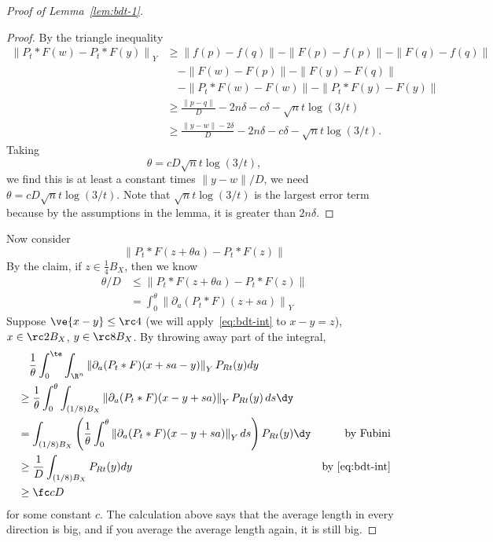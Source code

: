\begin{proof}[Proof of Lemma~\ref{lem:bdt-1}]
\begin{proof}
By the triangle inequality 
\begin{align*}
\left\|P_t * F(w) - P_t*F(y)\right\|_Y 
&\geq \|f(p) - f(q)\| - \|F(p) - f(p)\| - \|F(q) - f(q)\| \\
&\quad - \|F(w) - F(p)\| - \|F(y) - F(q)\| \\
&\quad- \|P_t*F(w) - F(w)\| - \|P_t*F(y) - F(y)\|\\
&\ge \frac{\|p - q\|}{D} - 2n\delta - c\delta - \sqrt{n}t\log(3/t)\\ &\geq \frac{\|y - w\| - 2\delta}{D} - 2n\delta - c\delta - \sqrt{n}t\log(3/t) .
\end{align*}
Taking $$\theta = cD\sqrt{n}t\log(3/t),$$ we find this is at least a constant times $\|y - w\|/D$, we need $\theta = cD\sqrt{n}t\log(3/t)$. Note that $\sqrt{n}t\log(3/t)$ is the largest error term because by the assumptions in the lemma, it is greater than $2n\delta$. 
\end{proof}
Now consider
\[
\left\|P_t * F(z + \theta a) - P_t * F(z)\right\|
\]
By the claim, if $z \in \frac{1}{4}B_X$, then we know 
\begin{align}
\theta/D &\leq \left\|P_t * F(z + \theta a) - P_t* F(z)\right\|\\
&= \int_{0}^{\theta} \left\|\partial_a(P_t*F)(z + sa)\right\|_Y 
\label{eq:bdt-int}
\end{align}
Suppose $\ve{x-y}\le \rc4$ (we will apply~\eqref{eq:bdt-int} to $x-y=z$), $x\in \rc2 B_X$, $y\in \rc8 B_X$. By throwing away part of the integral,
\begin{align}
&\quad \frac{1}{\theta}\int_0^{\te} \int_{\R^n} \left\| \partial_a(P_t * F)(x + sa - y)\right\|_Y P_{Rt}(y) dy\\
&\ge
\frac{1}{\theta} \int_0^{\theta} \int_{(1/8)B_X} \left\|\partial_a(P_t * F)(x - y + sa)\right\|_Y P_{Rt}(y) \,ds \dy\\
& = 
 \int_{(1/8)B_X} \left(\frac{1}{\theta}\int_0^{\theta} \left\|\partial_a(P_t * F)(x - y + sa)\right\|_Y ds \right) P_{Rt}(y) \dy&\text{by Fubini}\\
&\ge \frac{1}{D} \int_{(1/8)B_X} P_{Rt}(y)dy &\text{by }\eqref{eq:bdt-int}\\
&\ge \fc cD
\label{eq:bdt-f1}
\end{align}
for some constant $c$.
The calculation above says that the average length in every direction is big, and if you average the average length again, it is still big.

\end{proof}
